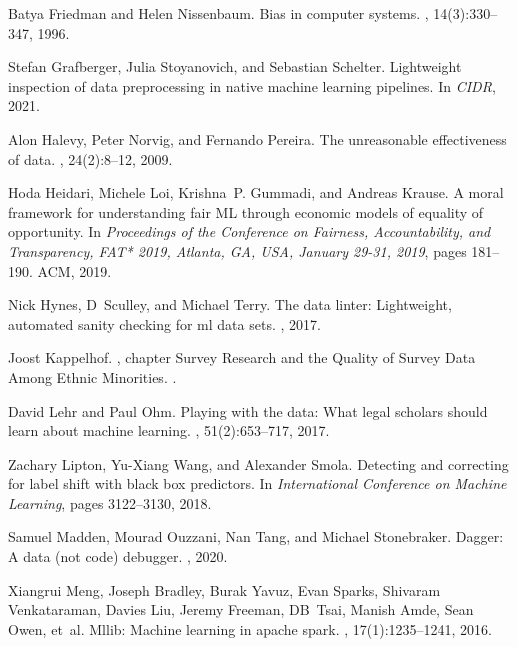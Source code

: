 \documentclass[11pt]{article}
\begin{document}
\begin{thebibliography}{10}
Batya Friedman and Helen Nissenbaum.
\newblock Bias in computer systems.
, 14(3):330--347, 1996.

Stefan Grafberger, Julia Stoyanovich, and Sebastian Schelter.
\newblock Lightweight inspection of data preprocessing in native machine
  learning pipelines.
\newblock In {\em CIDR}, 2021.

Alon Halevy, Peter Norvig, and Fernando Pereira.
\newblock The unreasonable effectiveness of data.
, 24(2):8--12, 2009.

Hoda Heidari, Michele Loi, Krishna~P. Gummadi, and Andreas Krause.
\newblock A moral framework for understanding fair {ML} through economic models
  of equality of opportunity.
\newblock In {\em Proceedings of the Conference on Fairness, Accountability,
  and Transparency, FAT* 2019, Atlanta, GA, USA, January 29-31, 2019}, pages
  181--190. {ACM}, 2019.

Nick Hynes, D~Sculley, and Michael Terry.
\newblock The data linter: Lightweight, automated sanity checking for ml data
  sets.
, 2017.

Joost Kappelhof.
, chapter Survey Research and the
  Quality of Survey Data Among Ethnic Minorities.
.

David Lehr and Paul Ohm.
\newblock Playing with the data: What legal scholars should learn about machine
  learning.
, 51(2):653--717, 2017.

Zachary Lipton, Yu-Xiang Wang, and Alexander Smola.
\newblock Detecting and correcting for label shift with black box predictors.
\newblock In {\em International Conference on Machine Learning}, pages
  3122--3130, 2018.

Samuel Madden, Mourad Ouzzani, Nan Tang, and Michael Stonebraker.
\newblock Dagger: A data (not code) debugger.
, 2020.

Xiangrui Meng, Joseph Bradley, Burak Yavuz, Evan Sparks, Shivaram Venkataraman,
  Davies Liu, Jeremy Freeman, DB~Tsai, Manish Amde, Sean Owen, et~al.
\newblock Mllib: Machine learning in apache spark.
, 17(1):1235--1241, 2016.


\end{thebibliography}
\end{document}

